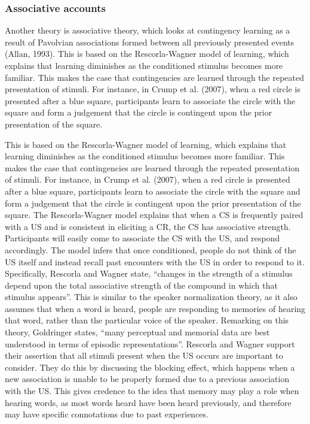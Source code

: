 \documentclass[
  english,
  man,floatsintext]{apa6}
\begin{document}
\hypertarget{associative-accounts}{%
\subsubsection{Associative accounts}\label{associative-accounts}}

Another theory is associative theory, which looks at contingency learning as a result of Pavolvian associations formed between all previously presented events (Allan, 1993). This is based on the Rescorla-Wagner model of learning, which explains that learning diminishes as the conditioned stimulus becomes more familiar. This makes the case that contingencies are learned through the repeated presentation of stimuli. For instance, in Crump et al. (2007), when a red circle is presented after a blue square, participants learn to associate the circle with the square and form a judgement that the circle is contingent upon the prior presentation of the square.

This is based on the Rescorla-Wagner model of learning, which explains that learning diminishes as the conditioned stimulus becomes more familiar. This makes the case that contingencies are learned through the repeated presentation of stimuli. For instance, in Crump et al. (2007), when a red circle is presented after a blue square, participants learn to associate the circle with the square and form a judgement that the circle is contingent upon the prior presentation of the square. The Rescorla-Wagner model explains that when a CS is frequently paired with a US and is consistent in eliciting a CR, the CS has associative strength. Participants will easily come to associate the CS with the US, and respond accordingly. The model infers that once conditioned, people do not think of the US itself and instead recall past encounters with the US in order to respond to it. Specifically, Rescorla and Wagner state, \enquote{changes in the strength of a stimulus depend upon the total associative strength of the compound in which that stimulus appears}. This is similar to the speaker normalization theory, as it also assumes that when a word is heard, people are responding to memories of hearing that word, rather than the particular voice of the speaker. Remarking on this theory, Goldringer states, \enquote{many perceptual and memorial data are best understood in terms of episodic representations}. Rescorla and Wagner support their assertion that all stimuli present when the US occurs are important to consider. They do this by discussing the blocking effect, which happens when a new association is unable to be properly formed due to a previous association with the US. This gives credence to the idea that memory may play a role when hearing words, as most words heard have been heard previously, and therefore may have specific connotations due to past experiences.
\end{document}
